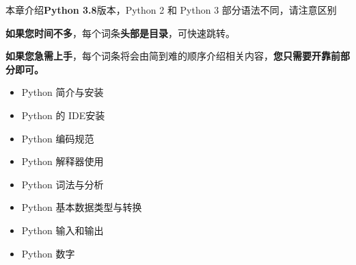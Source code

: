 
\begin{issues}
\issueTODO
\end{issues}

本章介绍\textbf{Python 3.8}版本，Python 2 和 Python 3 部分语法不同，请注意区别

\textbf{如果您时间不多}，每个词条\textbf{头部是目录}，可快速跳转。

\textbf{如果您急需上手}，每个词条将会由简到难的顺序介绍相关内容，\textbf{您只需要开靠前部分即可。}

\begin{itemize}
\item Python 简介与安装
\item Python 的 IDE安装
\item Python 编码规范
\item Python 解释器使用
\item Python 词法与分析
\item Python 基本数据类型与转换
\item Python 输入和输出
\item Python 数字
\end{itemize}
